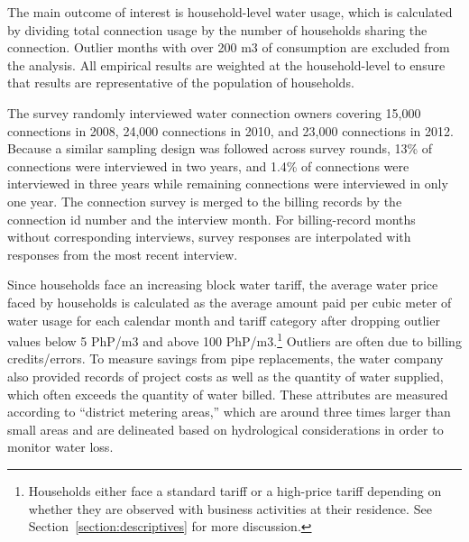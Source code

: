 \documentclass[12pt,table]{article}
\begin{document}
The main outcome of interest is household-level water usage, which is calculated by dividing total connection usage by the number of households sharing the connection.  Outlier months with over 200 m3 of consumption are excluded from the analysis.  All empirical results are weighted at the household-level to ensure that results are representative of the population of households.

The survey randomly interviewed water connection owners covering 15,000 connections in 2008, 24,000 connections in 2010, and 23,000 connections in 2012.  Because a similar sampling design was followed across survey rounds, 13\% of connections were interviewed in two years, and 1.4\% of connections were interviewed in three years while remaining connections were interviewed in only one year.  The connection survey is merged to the billing records by the connection id number and the interview month.  For billing-record months without corresponding interviews, survey responses are interpolated with responses from the most recent interview.

Since households face an increasing block water tariff, the average water price faced by households is calculated as the average amount paid per cubic meter of water usage for each calendar month and tariff category after dropping outlier values below 5 PhP/m3 and above 100 PhP/m3.\footnote{Households either face a standard tariff or a high-price tariff depending on whether they are observed with business activities at their residence.  See Section~\ref{section:descriptives} for more discussion.}  Outliers are often due to billing credits/errors.  To measure savings from pipe replacements, the water company also provided records of project costs as well as the quantity of water supplied, which often exceeds the quantity of water billed.  These attributes are measured according to ``district metering areas,'' which are around three times larger than small areas and are delineated based on hydrological considerations in order to monitor water loss.






\end{document}
